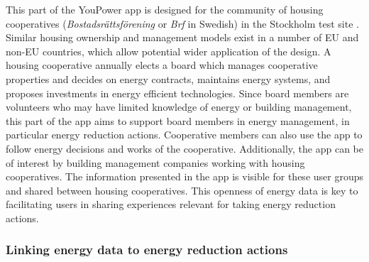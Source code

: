 This part of the YouPower app is designed for the community of housing cooperatives (\textit{Bostadsr{\"a}ttsf{\"o}rening} or \textit{Brf} in Swedish) in the Stockholm test site \cite{Hasselqvist2016}.
Similar housing ownership and management models exist in a number of EU and non-EU countries, which allow potential wider application of the design.
A housing cooperative annually elects a board which manages cooperative properties and decides on energy contracts, maintains energy systems, and proposes investments in energy efficient technologies. Since board members are volunteers who may have limited knowledge of energy or building management, this part of the app aims to support board members in energy management, in particular energy reduction actions. Cooperative members can also use the app to follow energy decisions and works of the cooperative. Additionally, the app can be of interest by building management companies working with housing cooperatives. 
The information presented in the app is visible for these user
groups and shared between housing cooperatives. This openness of energy data is key to
facilitating  users in sharing experiences relevant for taking energy reduction actions.

\subsubsection{Linking energy data to energy reduction actions}

